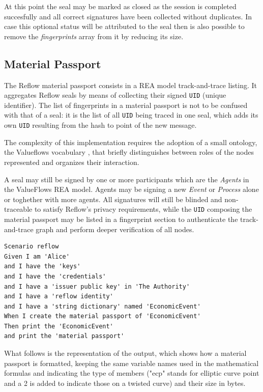 \documentclass[twocolumn]{article}
\begin{document}
At this point the seal may be marked as closed as the session is
completed succesfully and all correct signatures have been collected
without duplicates. In case this optional status will be attributed to
the seal then is also possible to remove the \emph{fingerprints}
array from it by reducing its size.



\subsection{Material Passport}

The Reflow material passport consists in a REA model track-and-trace
\citep{trackandtrace} listing. It aggregates Reflow seals by means of
collecting their signed \verb!UID! (unique identifier). The list of
fingerprints in a material passport is not to be confused with that of
a seal: it is the list of all \verb!UID! being traced in one seal,
which adds its own \verb!UID! resulting from the hash to point of the
new message.

The complexity of this implementation requires the adoption of a small
ontology, the Valueflows vocabulary \citep{valueflows}, that briefly
distinguishes between roles of the nodes represented and organizes
their interaction.

A seal may still be signed by one or more participants which are the
\emph{Agents} in the ValueFlows REA model. Agents may be signing a new
\emph{Event} or \emph{Process} alone or toghether with more agents.
All signatures will still be blinded and non-traceable to satisfy
Reflow's privacy requirements, while the \verb!UID! composing the
material passport may be listed in a fingerprint section to
authenticate the track-and-trace graph and perform deeper verification
of all nodes.

\begin{lstlisting}[style=zencode,caption={Create a new material passport}]
Scenario reflow
Given I am 'Alice'
and I have the 'keys'
and I have the 'credentials'
and I have a 'issuer public key' in 'The Authority'
and I have a 'reflow identity'
and I have a 'string dictionary' named 'EconomicEvent'
When I create the material passport of 'EconomicEvent'
Then print the 'EconomicEvent'
and print the 'material passport'
\end{lstlisting}

What follows is the representation of the output, which shows how a
material passport is formatted, keeping the same variable names used
in the mathematical formulas and indicating the type of members ("ecp"
stands for elliptic curve point and a 2 is added to indicate those on a twisted curve) and their size in bytes.
\end{document}
